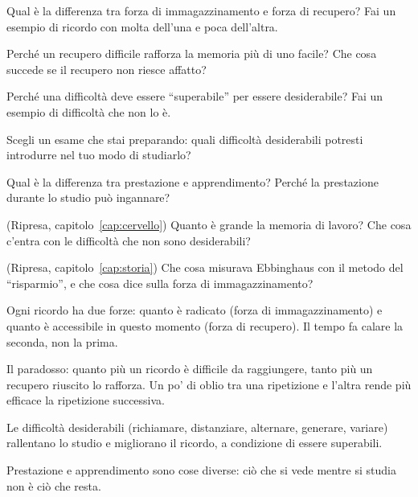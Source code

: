 \begin{domande}
  \item Qual è la differenza tra forza di immagazzinamento e forza di
        recupero? Fai un esempio di ricordo con molta dell'una e poca
        dell'altra.
  \item Perché un recupero difficile rafforza la memoria più di uno
        facile? Che cosa succede se il recupero non riesce affatto?
  \item Perché una difficoltà deve essere \enquote{superabile} per
        essere desiderabile? Fai un esempio di difficoltà che non lo è.
  \item Scegli un esame che stai preparando: quali difficoltà
        desiderabili potresti introdurre nel tuo modo di studiarlo?
  \item Qual è la differenza tra prestazione e apprendimento? Perché la
        prestazione durante lo studio può ingannare?
  \item (Ripresa, capitolo~\ref{cap:cervello}) Quanto è grande la
        memoria di lavoro? Che cosa c'entra con le difficoltà che non
        sono desiderabili?
  \item (Ripresa, capitolo~\ref{cap:storia}) Che cosa misurava
        Ebbinghaus con il metodo del \enquote{risparmio}, e che cosa
        dice sulla forza di immagazzinamento?
\end{domande}

\begin{sintesi}
  \item Ogni ricordo ha due forze: quanto è radicato (forza di
        immagazzinamento) e quanto è accessibile in questo momento
        (forza di recupero). Il tempo fa calare la seconda, non la
        prima.
  \item Il paradosso: quanto più un ricordo è difficile da raggiungere,
        tanto più un recupero riuscito lo rafforza. Un po' di oblio tra
        una ripetizione e l'altra rende più efficace la ripetizione
        successiva.
  \item Le difficoltà desiderabili (richiamare, distanziare, alternare,
        generare, variare) rallentano lo studio e migliorano il
        ricordo, a condizione di essere superabili.
  \item Prestazione e apprendimento sono cose diverse: ciò che si vede
        mentre si studia non è ciò che resta.
\end{sintesi}

\finecapitolo
